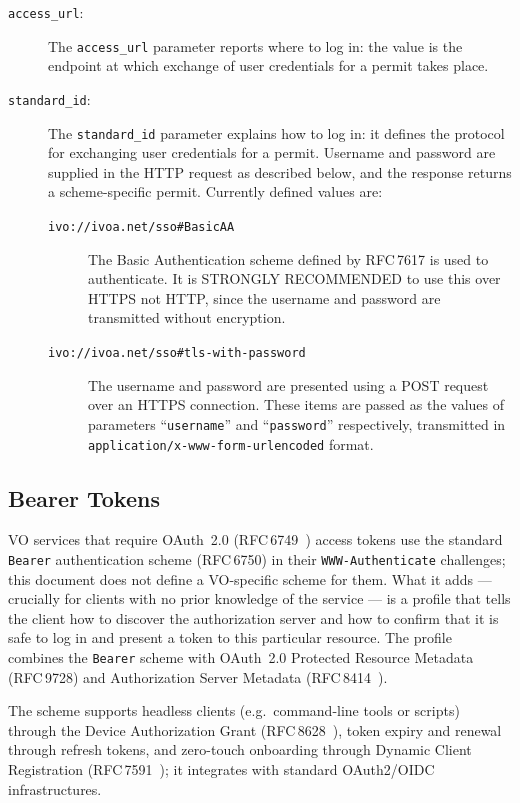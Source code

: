 \documentclass[11pt,a4paper]{ivoa}
\newcommand{\rfc}[1]{RFC\,#1}
\newcommand{\header}[1]{{\tt #1}}
\begin{document}
\begin{description}
\item[{\tt access\_url}:]
  The \verb|access_url| parameter reports where to log in:
  the value is the endpoint at which
  exchange of user credentials for a permit
  takes place.
%
\item[{\tt standard\_id}:]
  The \verb|standard_id| parameter explains how to log in:
  it defines the protocol for exchanging user credentials
  for a permit.
  Username and password are supplied in the HTTP request as described below,
  and the response returns a scheme-specific permit.
  Currently defined values are:
  \begin{description}
    \item[{\tt ivo://ivoa.net/sso\#BasicAA}]
          The Basic Authentication scheme defined by \rfc{7617} is used to
          authenticate.
          It is STRONGLY RECOMMENDED to use this over HTTPS not HTTP,
          since the username and password are transmitted without encryption.
    \item[{\tt ivo://ivoa.net/sso\#tls-with-password}]
          The username and password are presented using a POST request
          over an HTTPS connection.
          These items are passed as the values of parameters
          ``{\tt username}'' and ``{\tt password}'' respectively,
          transmitted in {\tt application/x-www-form-urlencoded} format.
  \end{description}
\end{description}


\subsection{Bearer Tokens}\label{sec:ivoa-bearer}

VO services that require OAuth~2.0 (\rfc{6749}~\citep{std:RFC6749}) access tokens use the standard
\verb|Bearer| authentication scheme (\rfc{6750}) in their
\header{WWW-Authenticate} challenges; this document does not define a
VO-specific scheme for them. What it adds --- crucially for clients with no
prior knowledge of the service --- is a profile that tells the client how to
discover the authorization server and how to confirm that it is safe to log in
and present a token to this particular resource. The profile combines the
\verb|Bearer| scheme with OAuth~2.0 Protected Resource Metadata (\rfc{9728})
and Authorization Server Metadata (\rfc{8414}~\citep{std:RFC8414}).

The scheme supports headless clients (e.g.\ command-line tools or scripts)
through the Device Authorization Grant (\rfc{8628}~\citep{std:RFC8628}), token expiry and renewal
through refresh tokens, and zero-touch onboarding through Dynamic Client
Registration (\rfc{7591}~\citep{std:RFC7591}); it integrates with standard OAuth2/OIDC
infrastructures.
\end{document}
